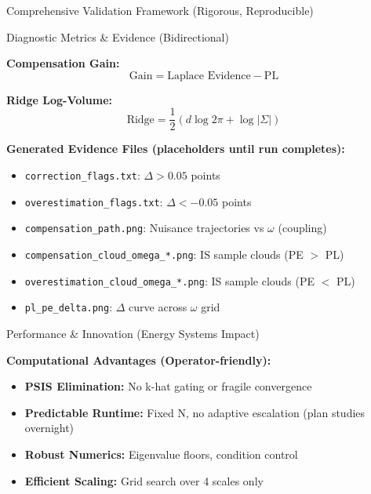 \documentclass[final,hyperref={pdfpagelabels=false}]{beamer}
\begin{document}
\begin{frame}[t]
\begin{columns}[t,totalwidth=\textwidth]
\begin{column}{0.32\textwidth}
\begin{block}{Comprehensive Validation Framework (Rigorous, Reproducible)}
\end{block}

\begin{block}{Diagnostic Metrics \& Evidence (Bidirectional)}
\small

\textbf{Compensation Gain:}
\begin{equation}
\text{Gain} = \text{Laplace Evidence} - \text{PL}
\end{equation}

\textbf{Ridge Log-Volume:}
\begin{equation}
\text{Ridge} = \frac{1}{2}(d \log 2\pi + \log|\Sigma|)
\end{equation}

\textbf{Generated Evidence Files (placeholders until run completes):}
\begin{itemize}
\item \texttt{correction\_flags.txt}: $\Delta > 0.05$ points
\item \texttt{overestimation\_flags.txt}: $\Delta < -0.05$ points  
\item \texttt{compensation\_path.png}: Nuisance trajectories vs $\omega$ (coupling)
\item \texttt{compensation\_cloud\_omega\_*.png}: IS sample clouds (PE $>$ PL)
\item \texttt{overestimation\_cloud\_omega\_*.png}: IS sample clouds (PE $<$ PL)
\item \texttt{pl\_pe\_delta.png}: $\Delta$ curve across $\omega$ grid
\end{itemize}

\end{block}

\begin{exampleblock}{Performance \& Innovation (Energy Systems Impact)}
\small

\textbf{Computational Advantages (Operator-friendly):}
\begin{itemize}
\item \textbf{PSIS Elimination:} No k-hat gating or fragile convergence
\item \textbf{Predictable Runtime:} Fixed N, no adaptive escalation (plan studies overnight)
\item \textbf{Robust Numerics:} Eigenvalue floors, condition control
\item \textbf{Efficient Scaling:} Grid search over 4 scales only
\end{itemize}


\end{exampleblock}
\end{column}
\end{columns}
\end{frame}
\end{document}

